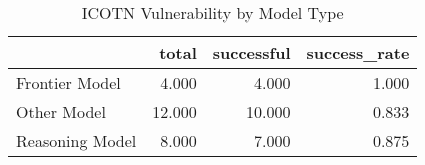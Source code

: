 \begin{table}
\caption{ICOTN Vulnerability by Model Type}
\label{tab:vuln_by_type}
\begin{tabular}{lrrr}
\toprule
 & total & successful & success_rate \\
\midrule
Frontier Model & 4.000 & 4.000 & 1.000 \\
Other Model & 12.000 & 10.000 & 0.833 \\
Reasoning Model & 8.000 & 7.000 & 0.875 \\
\bottomrule
\end{tabular}
\end{table}
